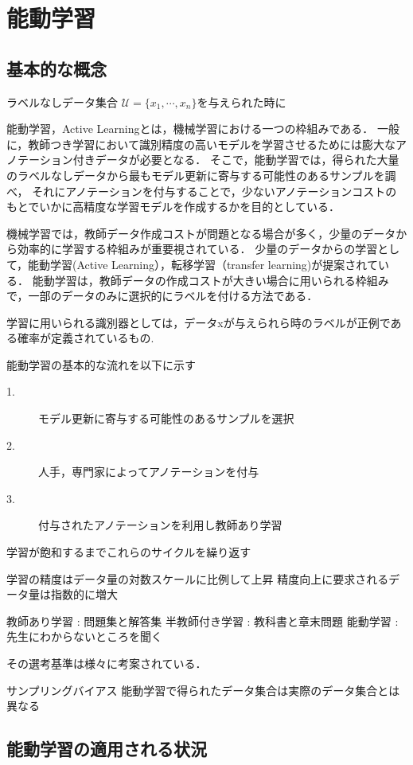 \chapter{能動学習}
\section{基本的な概念}

ラベルなしデータ集合 $\mathcal{U} = \{x_1, \cdots, x_n\}$を与えられた時に

能動学習，Active Learning\cite{settles2010active}とは，機械学習における一つの枠組みである．
一般に，教師つき学習において識別精度の高いモデルを学習させるためには膨大なアノテーション付きデータが必要となる．
そこで，能動学習では，得られた大量のラベルなしデータから最もモデル更新に寄与する可能性のあるサンプルを調べ，
それにアノテーションを付与することで，少ないアノテーションコストのもとでいかに高精度な学習モデルを作成するかを目的としている．

機械学習では，教師データ作成コストが問題となる場合が多く，少量のデータから効率的に学習する枠組みが重要視されている．
少量のデータからの学習として，能動学習(Active Learning），転移学習（transfer learning)が提案されている．
能動学習は，教師データの作成コストが大きい場合に用いられる枠組みで，一部のデータのみに選択的にラベルを付ける方法である．

学習に用いられる識別器としては，データxが与えられら時のラベルが正例である確率が定義されているもの.

能動学習の基本的な流れを以下に示す
\begin{description}
    \item[1.] モデル更新に寄与する可能性のあるサンプルを選択
    \item[2.] 人手，専門家によってアノテーションを付与
    \item[3.] 付与されたアノテーションを利用し教師あり学習
\end{description}

学習が飽和するまでこれらのサイクルを繰り返す

学習の精度はデータ量の対数スケールに比例して上昇
精度向上に要求されるデータ量は指数的に増大

教師あり学習 : 問題集と解答集
半教師付き学習 : 教科書と章末問題
能動学習 : 先生にわからないところを聞く


その選考基準は様々に考案されている．

サンプリングバイアス
    能動学習で得られたデータ集合は実際のデータ集合とは異なる

\section{能動学習の適用される状況}

